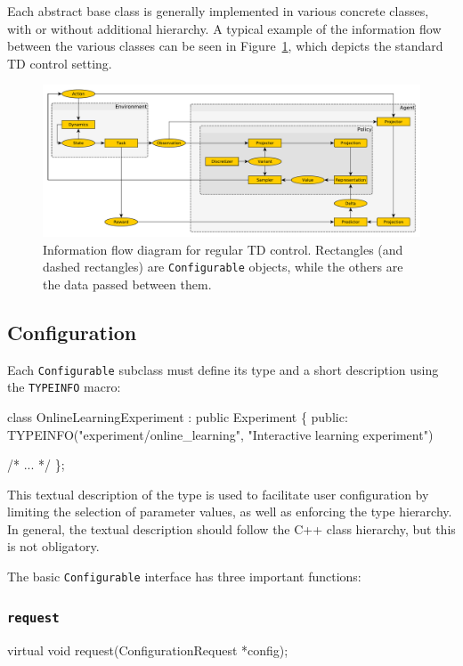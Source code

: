 \documentclass{article}
\newcommand{\txt}[1]{\texttt{#1}}
\newenvironment{code}{\alltt}{\endalltt}
\begin{document}
Each abstract base class is generally implemented in various concrete
classes, with or without additional hierarchy. A typical example of the
information flow between the various classes can be seen in Figure~\ref{fig:td},
which depicts the standard TD control setting.

\begin{figure}
\includegraphics[width=\linewidth]{td.pdf}
\caption{Information flow diagram for regular TD control. Rectangles (and
dashed rectangles) are \txt{Configurable} objects, while the others are the
data passed between them.}
\label{fig:td}
\end{figure}

\subsection{Configuration}

Each \txt{Configurable} subclass must define its type and a short
description using the \txt{TYPEINFO} macro:

\begin{code}
class OnlineLearningExperiment : public Experiment
\{
  public:
    TYPEINFO("experiment/online_learning", "Interactive learning experiment")
  
  /* ... */
\};
\end{code}

This textual description of the type is used to facilitate user
configuration by limiting the selection of parameter values, as well as enforcing the type
hierarchy. In general, the textual description should follow the C++ class
hierarchy, but this is not obligatory.

The basic \txt{Configurable} interface has three important functions:

\subsubsection{\txt{request}}
\begin{code}
virtual void request(ConfigurationRequest *config);
\end{code}
\end{document}
